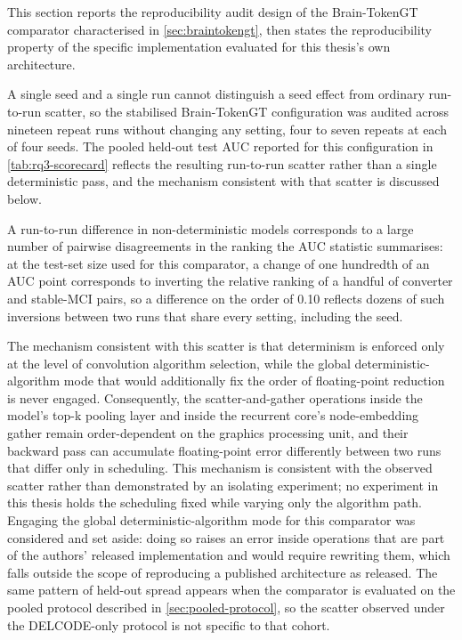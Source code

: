 This section reports the reproducibility audit design of the Brain-TokenGT comparator
characterised in \autoref{sec:braintokengt}, then states the reproducibility property of
the specific implementation evaluated for this thesis's own architecture.

A single seed and a single run cannot distinguish a seed effect from ordinary run-to-run
scatter, so the stabilised Brain-TokenGT configuration was audited across nineteen repeat
runs without changing any setting, four to seven repeats at each of four seeds. The pooled
held-out test \ac{AUC} reported for this configuration in \autoref{tab:rq3-scorecard}
reflects the resulting run-to-run scatter rather than a single deterministic pass, and the
mechanism consistent with that scatter is discussed below.

A run-to-run difference in non-deterministic models corresponds to a large number of pairwise
disagreements in the ranking the \ac{AUC} statistic summarises: at the test-set size used
for this comparator, a change of one hundredth of an \ac{AUC} point corresponds to
inverting the relative ranking of a handful of converter and stable-\ac{MCI} pairs, so a
difference on the order of 0.10 reflects dozens of such inversions between two runs that
share every setting, including the seed.

The mechanism consistent with this scatter is that determinism is enforced only at the
level of convolution algorithm selection, while the global deterministic-algorithm mode
that would additionally fix the order of floating-point reduction is never engaged.
Consequently, the scatter-and-gather operations inside the model's top-k pooling layer and
inside the recurrent core's node-embedding gather remain order-dependent on the graphics
processing unit, and their backward pass can accumulate floating-point error differently
between two runs that differ only in scheduling. This mechanism is consistent with the
observed scatter rather than demonstrated by an isolating experiment; no experiment in this
thesis holds the scheduling fixed while varying only the algorithm path. Engaging the
global deterministic-algorithm mode for this comparator was considered and set aside: doing
so raises an error inside operations that are part of the authors' released implementation
and would require rewriting them, which falls outside the scope of reproducing a published
architecture as released. The same pattern of held-out spread appears when the comparator
is evaluated on the pooled protocol described in \autoref{sec:pooled-protocol}, so the
scatter observed under the \ac{DELCODE}-only protocol is not specific to that cohort.

